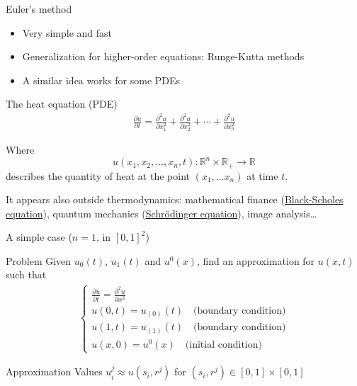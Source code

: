 \documentclass[11pt]{beamer}
\begin{document}
\begin{frame}{Euler's method}
	\begin{itemize}
		\item Very simple and fast
		\item Generalization for higher-order equations: Runge-Kutta methods
		\item A similar idea works for some PDEs
	\end{itemize}
\end{frame}

\begin{frame}{The heat equation (PDE)}
	\begin{align*}
		\frac{\partial u}{\partial t} = \frac{\partial^2 u}{\partial x_1^2} +
		\frac{\partial^2 u}{\partial x_2^2} + \cdots +
		\frac{\partial^2 u}{\partial x_n^2}
	\end{align*}
	
	Where
	\[u(x_1,x_2,\dots,x_n,t): \mathbb R^n\times \mathbb R_+\to \mathbb R\]
	describes the quantity of heat at the point $(x_1,\dots x_n)$ at time $t$.

	\vspace{0.3cm} It appears also outside thermodynamics: mathematical finance
	(\href{https://en.wikipedia.org/wiki/Black\%E2\%80\%93Scholes\_equation}%
	{Black-Scholes equation}), quantum mechanics
	(\href{https://en.wikipedia.org/wiki/Schr\%C3\%B6dinger\_equation}%
	{Schrödinger equation}), image analysis\dots
\end{frame}

\begin{frame}{A simple case ($n=1$, in $[0,1]^2$)}
	\begin{block}{Problem}
		Given $u_0(t)$, $u_1(t)$ and $u^0(x)$, find an approximation
		for $u(x,t)$ such that
		\begin{align*}
			\begin{cases}
				\frac{\partial u}{\partial t} =
					\frac{\partial^2 u}{\partial x^2} \\
				u(0,t) = u_{(0)}(t) \quad \text{(boundary condition)}\\
				u(1,t) = u_{(1)}(t) \quad \text{(boundary condition)}\\
				u(x,0) = u^0(x) \quad \text{(initial condition)}
			\end{cases}
		\end{align*}
	\end{block}

	\begin{block}{Approximation}
		Values $u_i^j\approx u(s_i, r^j)$ for
		$(s_i,r^j)\in [0,1]\times [0,1]$
	\end{block}
\end{frame}
\end{document}
